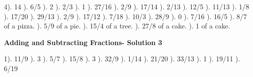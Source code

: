 \documentclass{article}%
\begin{document}
4). 14%
). 6/5%
). 2%
). 2/3%
). 1%
). 27/16%
). 2/9%
). 17/14%
). 2/13%
). 12/5%
). 11/13%
). 1/8%
). 17/20%
). 29/13%
). 2/9%
). 17/12%
). 7/18%
). 10/3%
). 28/9%
). 0%
). 7/16%
). 16/5%
). 8/7 of a pizza.%
). 5/9 of a pie.%
). 15/4 of a tree.%
). 27/8 of a cake.%
). 1 of a cake.%
\newline%
\newpage%
\large%
\begin{center}%
\textbf{Adding and Subtracting Fractions- Solution 3}%
\newline%
\end{center} \normalsize%
1). 11/9%
). 3%
). 5/7%
). 15/8%
). 3%
). 32/9%
). 1/14%
). 21/20%
). 33/13%
). 1%
). 19/11%
). 6/19%
\newline%
\end{document}
